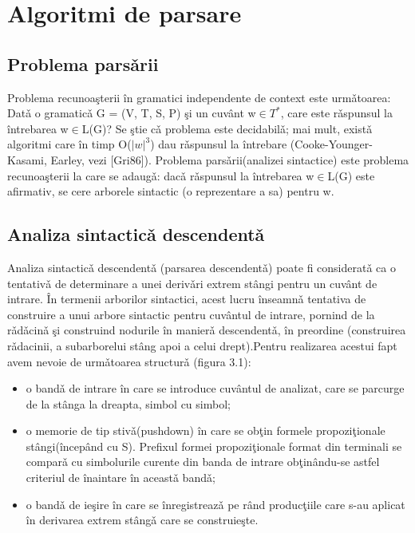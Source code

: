 \chapter{Algoritmi de parsare}
\label{Chapter3}

\section{Problema pars\v arii}
Problema recunoa\c sterii \^ in gramatici independente de context este urm\v atoarea: Dat\v a o
gramatic\v a G = (V, T, S, P) \c si un cuv\^ ant w$\in T^{*}$, care este r\v aspunsul la \^ intrebarea w$\in$L(G)? Se
\c stie c\v a problema este decidabil\v a; mai mult, exist\v a algoritmi care \^ in timp O($|w|^{3}$) dau r\v aspunsul la \^ intrebare (Cooke-Younger-Kasami, Earley, vezi [Gri86]).
Problema pars\v arii(analizei sintactice) este problema recunoa\c sterii la care se adaug\v a: dac\v a r\v aspunsul la \^ intrebarea w$\in$L(G) este afirmativ, se cere arborele sintactic (o reprezentare
a sa) pentru w. 

\section{Analiza sintactic\v a descendent\v a}
Analiza sintactic\v a descendent\v a
(parsarea descendent\v a) poate fi considerat\v a ca o tentativ\v a
de determinare a unei deriv\v ari extrem st\^ angi pentru un cuv\^ ant de intrare. \^ In termenii arborilor sintactici, acest lucru \^ inseamn\v a tentativa de construire a unui arbore sintactic pentru cuv\^ antul de intrare, pornind de la r\v ad\v acin\v a \c si construind nodurile \^ in manier\v a descendent\v a, \^ in preordine (construirea r\v adacinii, a subarborelui st\^ ang apoi a celui drept).Pentru realizarea acestui fapt avem nevoie de urm\v atoarea structur\v a
(figura 3.1):
\begin{itemize}
\item
{
	o band\v a de intrare \^ in care se introduce cuv\^ antul de analizat, care se parcurge de la st\^ anga la dreapta, simbol cu simbol; 
}
\item
{
	o memorie de tip stiv\v a(pushdown) \^ in care se ob\c tin formele propozi\c tionale st\^ angi(\^ incep\^ and cu S). Prefixul formei propozi\c tionale format din terminali se compar\v a cu simbolurile curente din banda de intrare ob\c tin\^andu-se astfel criteriul de \^ inaintare \^ in aceast\v a band\v a; 
}
\item
{
	o band\v a de ie\c sire \^ in care se \^ inregistreaz\v a pe r\^ and produc\c tiile care s-au aplicat \^ in derivarea extrem st\^ ang\v a care se construie\c ste. 
}

\end{itemize}

